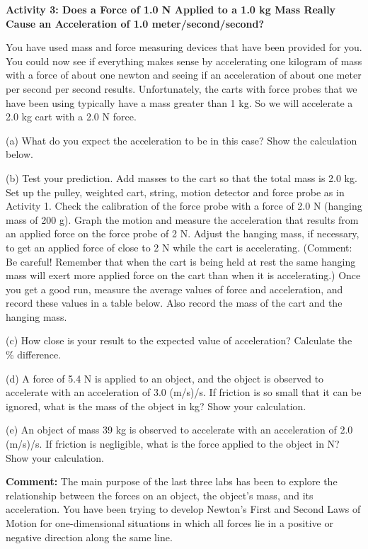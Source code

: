 \pagebreak[2]
\textbf{Activity 3: Does a Force of 1.0 N Applied to a 1.0 kg Mass Really Cause
an Acceleration of 1.0 meter/second/second?} 

You have used mass and force measuring devices that have been provided for you.
You could now see if everything makes sense by accelerating one kilogram of
mass with a force of about one newton and seeing if an acceleration of about
one meter per second per second results. Unfortunately, the carts with force
probes that we have been using typically have a mass greater than 1 kg. So we
will accelerate a 2.0 kg cart with a 2.0 N force.

(a) What do you expect the acceleration to be in this case? Show the calculation
below.
\vspace{20mm}

(b) Test your prediction. Add masses to the cart so that the total mass is 2.0
kg. Set up the pulley, weighted cart, string, motion detector and force probe
as in Activity 1. Check the calibration of the force probe with a force of 2.0
N (hanging mass of 200 g). Graph the motion and measure the acceleration that
results from an applied force on the force probe of 2 N. Adjust the hanging
mass, if necessary, to get an applied force of close to 2 N while the cart is
accelerating. (Comment: Be careful! Remember that when the cart is being held
at rest the same hanging mass will exert more applied force on the cart than
when it is accelerating.) Once you get a good run, measure the average values
of force and acceleration, and record these values in a table below. Also record
the mass of the cart and the hanging mass.
\vspace{30mm}

(c) How close is your result to the expected value of acceleration? Calculate
the \% difference.
\vspace{20mm}

(d) A force of 5.4 N is applied to an object, and the object is observed to
accelerate with an acceleration of 3.0 (m/s)/s. If friction is so small that it
can be ignored, what is the mass of the object in kg? Show your calculation.
\vspace{20mm}

(e) An object of mass 39 kg is observed to accelerate with an acceleration of
2.0 (m/s)/s. If friction is negligible, what is the force applied to the object
in N? Show your calculation.
\vspace{20mm}

\textbf{Comment:} The main purpose of the last three labs has been to explore
the relationship between the forces on an object, the object's mass, and its
acceleration. You have been trying to develop Newton's First and Second Laws
of Motion for one-dimensional situations in which all forces lie in a positive
or negative direction along the same line. 

